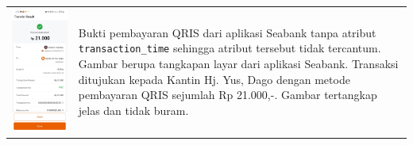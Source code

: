 \begin{table}[h!]
\begin{tabularx}{\textwidth}{m{} X}
        \includegraphics[width=\linewidth]{images/contoh-data/qris-4.jpg}
        & 
        Bukti pembayaran QRIS dari aplikasi Seabank tanpa atribut \texttt{transaction\_time} sehingga atribut tersebut tidak tercantum. Gambar berupa tangkapan layar dari aplikasi Seabank. Transaksi ditujukan kepada Kantin Hj. Yus, Dago dengan metode pembayaran QRIS sejumlah Rp 21.000,-. Gambar tertangkap jelas dan tidak buram. \\
    \end{tabularx}
\end{table}

